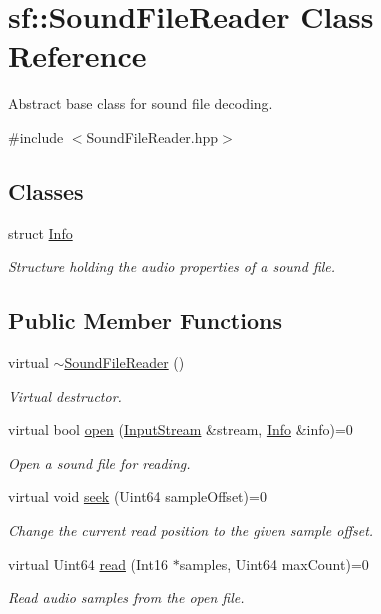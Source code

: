 \hypertarget{classsf_1_1_sound_file_reader}{}\section{sf\+:\+:Sound\+File\+Reader Class Reference}
\label{classsf_1_1_sound_file_reader}


Abstract base class for sound file decoding.  




{\ttfamily \#include $<$Sound\+File\+Reader.\+hpp$>$}

\subsection*{Classes}
\begin{DoxyCompactItemize}
\item 
struct \mbox{\hyperlink{structsf_1_1_sound_file_reader_1_1_info}{Info}}
\begin{DoxyCompactList}\small\item\em Structure holding the audio properties of a sound file. \end{DoxyCompactList}\end{DoxyCompactItemize}
\subsection*{Public Member Functions}
\begin{DoxyCompactItemize}
\item 
virtual \mbox{\hyperlink{classsf_1_1_sound_file_reader_a34163297f302d15818c76b54f815acc8}{$\sim$\+Sound\+File\+Reader}} ()
\begin{DoxyCompactList}\small\item\em Virtual destructor. \end{DoxyCompactList}\item 
virtual bool \mbox{\hyperlink{classsf_1_1_sound_file_reader_aa1d2fee2ba8f359c833ab74590d55935}{open}} (\mbox{\hyperlink{classsf_1_1_input_stream}{Input\+Stream}} \&stream, \mbox{\hyperlink{structsf_1_1_sound_file_reader_1_1_info}{Info}} \&info)=0
\begin{DoxyCompactList}\small\item\em Open a sound file for reading. \end{DoxyCompactList}\item 
virtual void \mbox{\hyperlink{classsf_1_1_sound_file_reader_a1e18ade5ffe882bdfa20a2ebe7e2b015}{seek}} (Uint64 sample\+Offset)=0
\begin{DoxyCompactList}\small\item\em Change the current read position to the given sample offset. \end{DoxyCompactList}\item 
virtual Uint64 \mbox{\hyperlink{classsf_1_1_sound_file_reader_a3b7d86769ea07e24e7b0f0486bed7591}{read}} (Int16 $\ast$samples, Uint64 max\+Count)=0
\begin{DoxyCompactList}\small\item\em Read audio samples from the open file. \end{DoxyCompactList}\end{DoxyCompactItemize}


